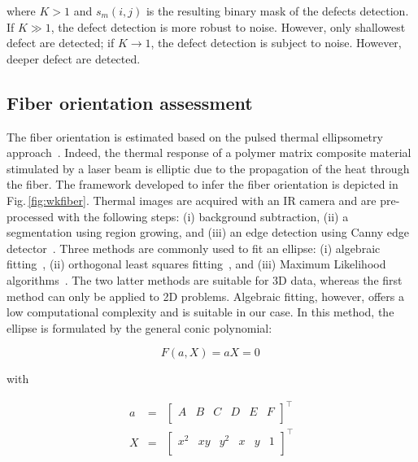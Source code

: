 \documentclass[12pt]{spieman}
\begin{document}
\begin{spacing}{2}
\noindent where $K > 1$ and $s_m(i,j)$ is the resulting binary mask of the defects detection.
If $K \gg 1$, the defect detection is more robust to noise. However, only shallowest defect are detected; if $K \to 1$, the defect detection is subject to noise. However, deeper defect are detected.

\subsection{Fiber orientation assessment}\label{subsec:32}


The fiber orientation is estimated based on the pulsed thermal ellipsometry approach~\cite{Cielo1987}.
Indeed, the thermal response of a polymer matrix composite material stimulated by a laser beam is elliptic due to the propagation of the heat through the fiber.
The framework developed to infer the fiber orientation is depicted in Fig.\,\ref{fig:wkfiber}.
Thermal images are acquired with an IR camera and are pre-processed with the following steps: (i) background subtraction, (ii) a segmentation using region growing, and (iii) an edge detection using Canny edge detector~\cite{Canny1986}. 
Three methods are commonly used to fit an ellipse: (i) algebraic fitting~\cite{Fitzgibbon1999}, (ii) orthogonal least squares fitting~\cite{Ahn2001}, and (iii) Maximum Likelihood algorithms~\cite{Chojnacki2000}. 
The two latter methods are suitable for 3D data, whereas the first method can only be applied to 2D problems.
Algebraic fitting, however, offers a low computational complexity and is suitable in our case.
In this method, the ellipse is formulated by the general conic polynomial:

\begin{equation}
  \label{eq:4}
  F(a, X) = aX = 0 \,
\end{equation}

\noindent with 

\begin{eqnarray}
  a & = & \begin{bmatrix} A & B & C & D & E & F \\ \end{bmatrix}^\intercal \nonumber\\
  X & = & \begin{bmatrix} x^2 & xy & y^2 & x & y & 1 \\ \end{bmatrix}^\intercal \nonumber
\end{eqnarray}


\end{spacing}
\end{document}
